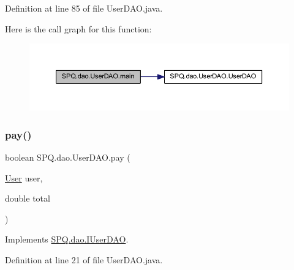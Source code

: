 Definition at line 85 of file User\+D\+A\+O.\+java.

Here is the call graph for this function\+:
\nopagebreak
\begin{figure}[H]
\begin{center}
\leavevmode
\includegraphics[width=350pt]{class_s_p_q_1_1dao_1_1_user_d_a_o_a8f6efdd35a56fedb08c9c9c62586c36b_cgraph}
\end{center}
\end{figure}
\mbox{\label{class_s_p_q_1_1dao_1_1_user_d_a_o_a8223c677b1ae55147860ea533be434a7}} 
\subsubsection{\texorpdfstring{pay()}{pay()}}
{\footnotesize\ttfamily boolean S\+P\+Q.\+dao.\+User\+D\+A\+O.\+pay (\begin{DoxyParamCaption}\item[{\mbox{\hyperlink{class_s_p_q_1_1data_1_1_user}{User}}}]{user,  }\item[{double}]{total }\end{DoxyParamCaption})}



Implements \mbox{\hyperlink{interface_s_p_q_1_1dao_1_1_i_user_d_a_o_a8a4257a186a80d5842e26aeb1140a402}{S\+P\+Q.\+dao.\+I\+User\+D\+AO}}.



Definition at line 21 of file User\+D\+A\+O.\+java.

